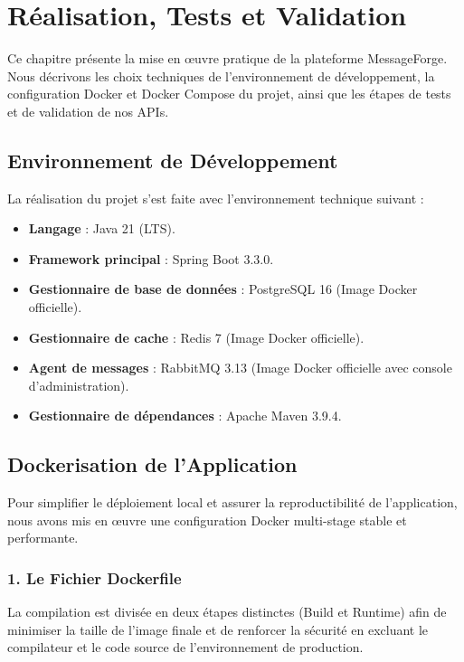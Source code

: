 \chapter{Réalisation, Tests et Validation}
\label{chapter:realisation}

Ce chapitre présente la mise en œuvre pratique de la plateforme MessageForge. Nous décrivons les choix techniques de l'environnement de développement, la configuration Docker et Docker Compose du projet, ainsi que les étapes de tests et de validation de nos APIs.

\section{Environnement de Développement}

La réalisation du projet s'est faite avec l'environnement technique suivant :
\begin{itemize}
    \item \textbf{Langage} : Java 21 (LTS).
    \item \textbf{Framework principal} : Spring Boot 3.3.0.
    \item \textbf{Gestionnaire de base de données} : PostgreSQL 16 (Image Docker officielle).
    \item \textbf{Gestionnaire de cache} : Redis 7 (Image Docker officielle).
    \item \textbf{Agent de messages} : RabbitMQ 3.13 (Image Docker officielle avec console d'administration).
    \item \textbf{Gestionnaire de dépendances} : Apache Maven 3.9.4.
\end{itemize}

\section{Dockerisation de l'Application}

Pour simplifier le déploiement local et assurer la reproductibilité de l'application, nous avons mis en œuvre une configuration Docker multi-stage stable et performante.

\subsection{1. Le Fichier Dockerfile}
La compilation est divisée en deux étapes distinctes (Build et Runtime) afin de minimiser la taille de l'image finale et de renforcer la sécurité en excluant le compilateur et le code source de l'environnement de production.


